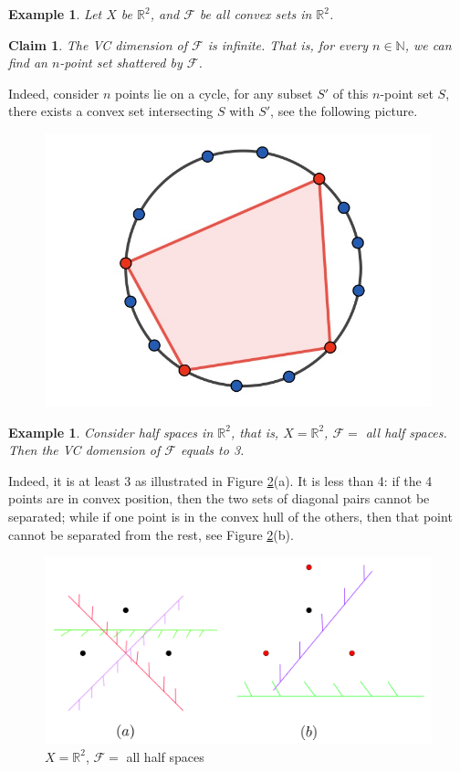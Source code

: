 \documentclass{article}
\newtheorem{claim}[theorem]{Claim}
\newtheorem{example}[theorem]{Example}
\theoremstyle{definition}
\begin{document}
\begin{example}
Let $X$ be $\mathbb{R}^2$, and $\mathcal{F}$ be all convex sets in $\mathbb{R}^2$.
\end{example}
\begin{claim}
    The VC dimension of $\mathcal{F}$ is infinite. That is, for every $n\in \mathbb{N}$, we can find an $n$-point set shattered by $\mathcal{F}$.
\end{claim}
Indeed, consider $n$ points lie on a cycle, for any subset $S'$ of this $n$-point set $S$, there exists a convex set intersecting $S$ with $S'$, see the following picture. 

\begin{figure}[H]
        \centering
        \includegraphics[scale=0.2]{20-1.jpg}
        \label{fig:20-1}
\end{figure}

\begin{example}
Consider half spaces in $\mathbb{R}^2$, that is, $X=\mathbb{R}^2$, $\mathcal{F}=$ all half spaces. Then the VC domension of $\mathcal{F}$ equals to 3.  
\end{example}
Indeed, it is at least 3 as illustrated in Figure \ref{fig:20-2}(a). It is less than 4: if the 4 points are in convex position, then the two sets of diagonal pairs cannot be separated; while if one point is in the convex hull of the others, then that point cannot be separated from the rest, see Figure \ref{fig:20-2}(b).
\begin{figure}[H]
        \centering
        \includegraphics[scale=0.3]{20-2.jpg}
        \caption{$X=\mathbb{R}^2$, $\mathcal{F}=$ all half spaces}
        \label{fig:20-2}
\end{figure}
\end{document}
